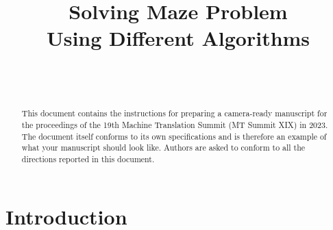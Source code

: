 \documentclass[]{article}
\begin{document}
\title{\bf Solving Maze Problem \\
  Using Different Algorithms}

\author{ \hfill {}\\
\AND
        \hfill {}\\
}

\maketitle
\pagestyle{empty}

\begin{abstract}
This document contains the instructions for preparing a camera-ready manuscript for the proceedings of the 19th Machine Translation Summit (MT Summit XIX) in 2023. The document itself conforms to its own specifications and is therefore an example of what your manuscript should look like. Authors are asked to conform to all the directions reported in this document.
\end{abstract}

\section{Introduction}
\end{document}
